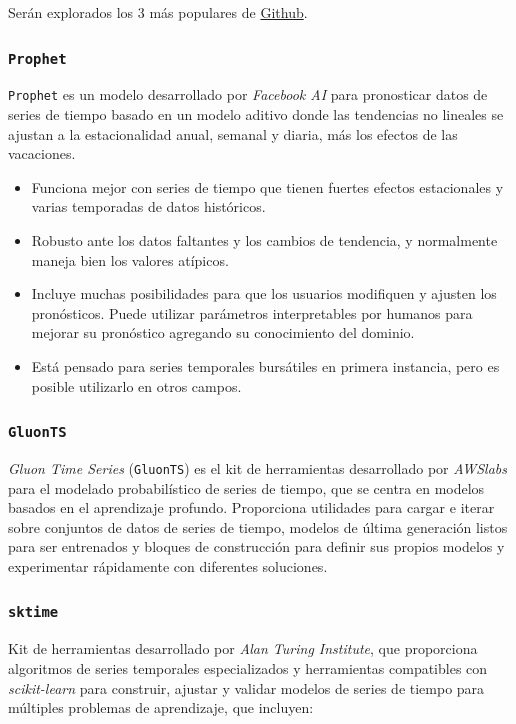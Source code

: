 \documentclass[a4paper,12pt]{article}
\begin{document}
Serán explorados los 3 más populares de \href{http://www.github.com}{Github}.

\subsubsection{\texttt{Prophet}}
\texttt{Prophet} es un modelo desarrollado por \textit{Facebook AI} para pronosticar datos de series de tiempo basado en un modelo aditivo donde las tendencias no lineales se ajustan a la estacionalidad anual, semanal y diaria, más los efectos de las vacaciones. \citep{prophet}

\begin{itemize}[noitemsep, topsep=2pt]
	\item Funciona mejor con series de tiempo que tienen fuertes efectos estacionales y varias temporadas de datos históricos.
	\item Robusto ante los datos faltantes y los cambios de tendencia, y normalmente maneja bien los valores atípicos.
	\item Incluye muchas posibilidades para que los usuarios modifiquen y ajusten los pronósticos. Puede utilizar parámetros interpretables por humanos para mejorar su pronóstico agregando su conocimiento del dominio.
	\item Está pensado para series temporales bursátiles en primera instancia, pero es posible utilizarlo en otros campos.
\end{itemize}

\subsubsection{\texttt{GluonTS}}
\textit{Gluon Time Series} (\texttt{GluonTS}) es el kit de herramientas desarrollado por \textit{AWSlabs} para el modelado probabilístico de series de tiempo, que se centra en modelos basados ​​en el aprendizaje profundo. Proporciona utilidades para cargar e iterar sobre conjuntos de datos de series de tiempo, modelos de última generación listos para ser entrenados y bloques de construcción para definir sus propios modelos y experimentar rápidamente con diferentes soluciones. \citep{gluonts}

\subsubsection{\texttt{sktime}}
Kit de herramientas desarrollado por \textit{Alan Turing Institute}, que proporciona algoritmos de series temporales especializados y herramientas compatibles con \textit{scikit-learn} para construir, ajustar y validar modelos de series de tiempo para múltiples problemas de aprendizaje, que incluyen: \citep{sktime}
\end{document}

